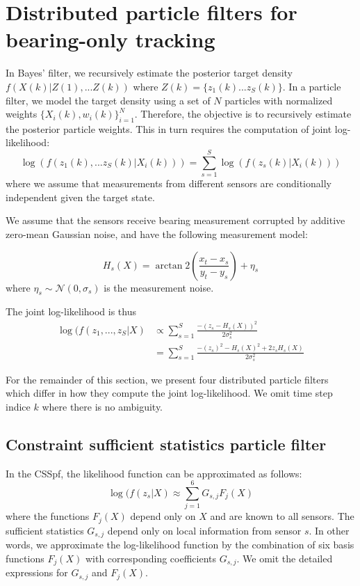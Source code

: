 \documentclass[10pt,letterpaper,final]{article}
\begin{document}
\section{Distributed particle filters for bearing-only tracking}
\label{sec:pf}
In Bayes' filter, we recursively estimate the posterior target density $f(X(k)|Z(1),...Z(k))$ where $Z(k) = \{ z_1(k)...z_S(k)\}$. In a particle filter, we model the target density using a set of $N$ particles with normalized weights $\{X_i(k), w_i(k)\}_{i=1}^N$. Therefore, the objective is to recursively estimate the posterior particle weights. This in turn requires the computation of joint log-likelihood:
\begin{equation}
\log(f(z_1(k),...z_S(k)|X_i(k)))=\sum_{s=1}^S\log\left(f(z_s(k)|X_i(k))\right)
\label{eqn:joint_log_lh}
\end{equation}
where we assume that measurements from different sensors are conditionally independent given the target state. 

We assume that the sensors receive bearing measurement corrupted by additive zero-mean Gaussian noise, and have the following measurement model:

\begin{equation}
H_s(X)= \arctan2 \left( \frac{x_t-x_s}{y_t-y_s} \right) + \eta_s
\end{equation}
where $\eta_s \sim \mathcal{N}(0, \sigma_s)$ is the measurement noise. 

The joint log-likelihood is thus
\begin{align}
\log(f(z_1,..., z_S|X) &\propto \sum_{s=1}^S \frac{-(z_s-H_s(X))^2}{2\sigma_s^2} \nonumber \\ 
&= \sum_{s=1}^S \frac{-(z_s)^2-H_s(X)^2+2z_sH_s(X)}{2\sigma_s^2}
\label{eqn:log_lh_normal}
\end{align}

For the remainder of this section, we present four distributed particle filters which differ in how they compute the joint log-likelihood. We omit time step indice $k$ where there is no ambiguity. 

\subsection{Constraint sufficient statistics particle filter}
In the CSSpf, the likelihood function can be approximated as follows:
\begin{equation}
\log(f(z_s|X) \approx \sum_{j=1}^6 G_{s,j}F_j(X)
\end{equation}
where the functions $F_j(X)$ depend only on $X$ and are known to all sensors. The sufficient statistics $G_{s,j}$ depend only on local information from sensor $s$. In other words, we approximate the log-likelihood function by the combination of six basis functions $F_j(X)$ with corresponding coefficients $G_{s,j}$. We omit the detailed expressions for $G_{s,j}$ and $F_j(X)$. 
\end{document}

